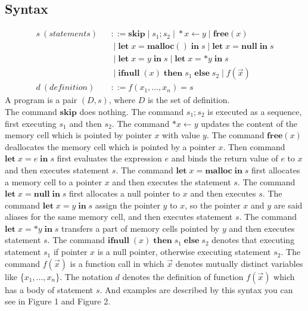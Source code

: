 \documentclass[english]{jssst_ppl} %
\newcommand\tB{\;|\;}
\newcommand\LET{\mathbf{let}\;}
\newcommand\IN{\mathbf{in}\;}
\newcommand\SKIP{\mathbf{skip}}
\newcommand\NULL{\mathbf{null}\;}
\newcommand\IFNULL{\mathbf{ifnull}\;}
\newcommand\THEN{\mathbf{then}\;}
\newcommand\ELSE{\mathbf{else}\;}
\newcommand\MALLOC{\mathbf{malloc()}\;}
\newcommand\Malloc{\mathbf{malloc}}
\newcommand\Free{\mathbf{free}}
\newcommand\Cirx{(x)}
\theoremstyle{definition}
\begin{document}
\subsection{Syntax}
\begin{eqnarray*}
  s \ (\mathit{statements})& &::=  \SKIP \tB s_{1};s_{2} \tB *x \leftarrow y \tB \Free \Cirx \\
  & & \tB \LET x = \MALLOC \IN s \tB \LET x = \NULL \IN s  \\
  & & \tB \LET x = y \; \IN s \tB   \LET x = *y \; \IN s \\
  & &\tB \IFNULL(x) \; \THEN s_{1}\; \ELSE s_{2} \tB f(\vec{x})\\
  d \ (\mathit{definition})& &::= f(x_{1},\dots,x_{n}) = s
\end{eqnarray*}
A program is a pair $(D,s)$, where $D$ is the set of definition.\\
The command $\SKIP$ does nothing. The command $s_{1};s_{2}$ is executed as a sequence, first executing $s_{1}$ and then $s_{2}$. The command $*x \leftarrow y$ updates the content of the memory cell which is pointed by pointer $x$ with value $y$. The command $\Free \Cirx$ deallocates the memory cell which is pointed by a pointer $x$. Then command $\LET x = e \; \IN s$ first evaluates the expression $e$ and binds the return value of $e$ to $x$ and then executes statement $s$. The command $\LET x = \Malloc \; \IN s$ first allocates a memory cell to a pointer $x$ and then executes the statement $s$. The command $\LET x = \NULL  \IN s$ first allocates a null pointer to $x$ and then executes $s$. The command $\LET x = y \; \IN s$ assign the pointer $y$ to $x$, so the pointer $x$ and $y$ are said aliases for the same memory cell, and then executes statement $s$. The command $\LET x = *y \; \IN s$ transfers a part of memory cells pointed by $y$ and then executes statement $s$. The command $\IFNULL(x) \; \THEN s_{1} \; \ELSE s_{2}$ denotes that  executing statement $s_{1}$ if pointer $x$ is a null pointer, otherwise executing statement $s_{2}$. The command $f(\vec{x})$ is a function call in which $\vec{x}$ denotes mutually distinct variables like \{$x_{1}, \dots, x_{n}$\}. The notation $d$ denotes the definition of function $f(\vec{x})$ which has a body of statement $s$. And examples are described by this syntax you can see in Figure 1 and  Figure 2.
\end{document}
